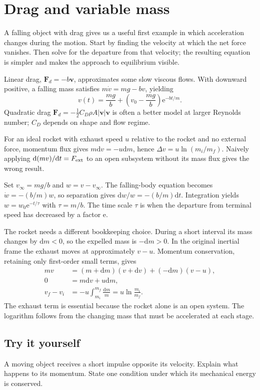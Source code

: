 \documentclass[11pt,oneside]{book}
\newcommand{\dd}{\mathrm{d}}
\newcommand{\ee}{\mathrm{e}}
\newcommand{\vect}[1]{\boldsymbol{#1}}
\theoremstyle{reviewstyle}
\newcommand{\learningcheck}[1]{\subsection*{Try it yourself}\noindent #1\par}
\begin{document}
\section{Drag and variable mass}
A falling object with drag gives us a useful first example in which acceleration changes during the motion. Start by finding the velocity at which the net force vanishes. Then solve for the departure from that velocity; the resulting equation is simpler and makes the approach to equilibrium visible.

Linear drag, $\vect F_d=-b\vect v$, approximates some slow viscous flows. With downward positive, a falling mass satisfies $m\dot v=mg-bv$, yielding
\begin{equation}
v(t)=\frac{mg}{b}+\left(v_0-\frac{mg}{b}\right)\ee^{-bt/m}.
\end{equation}
Quadratic drag $\vect F_d=-\tfrac12C_D\rho A|\vect v|\vect v$ is often a better model at larger Reynolds number; $C_D$ depends on shape and flow regime.

For an ideal rocket with exhaust speed $u$ relative to the rocket and no external force, momentum flux gives $m\dd v=-u\dd m$, hence $\Delta v=u\ln(m_i/m_f)$. Naively applying $\dd(mv)/\dd t=F_{\rm ext}$ to an open subsystem without its mass flux gives the wrong result.

Set $v_\infty=mg/b$ and $w=v-v_\infty$. The falling-body equation becomes $\dot w=-(b/m)w$, so separation gives $\dd w/w=-(b/m)\dd t$. Integration yields $w=w_0\ee^{-t/\tau}$ with $\tau=m/b$. The time scale $\tau$ is when the departure from terminal speed has decreased by a factor $\ee$.

The rocket needs a different bookkeeping choice. During a short interval its mass changes by $\dd m<0$, so the expelled mass is $-\dd m>0$. In the original inertial frame the exhaust moves at approximately $v-u$. Momentum conservation, retaining only first-order small terms, gives
\begin{align}
mv&=(m+\dd m)(v+\dd v)+(-\dd m)(v-u),\\
0&=m\dd v+u\dd m,\\
v_f-v_i&=-u\int_{m_i}^{m_f}\frac{\dd m}{m}
=u\ln\frac{m_i}{m_f}.
\end{align}
The exhaust term is essential because the rocket alone is an open system. The logarithm follows from the changing mass that must be accelerated at each stage.

\learningcheck{A moving object receives a short impulse opposite its velocity. Explain what happens to its momentum. State one condition under which its mechanical energy is conserved.}
\end{document}

